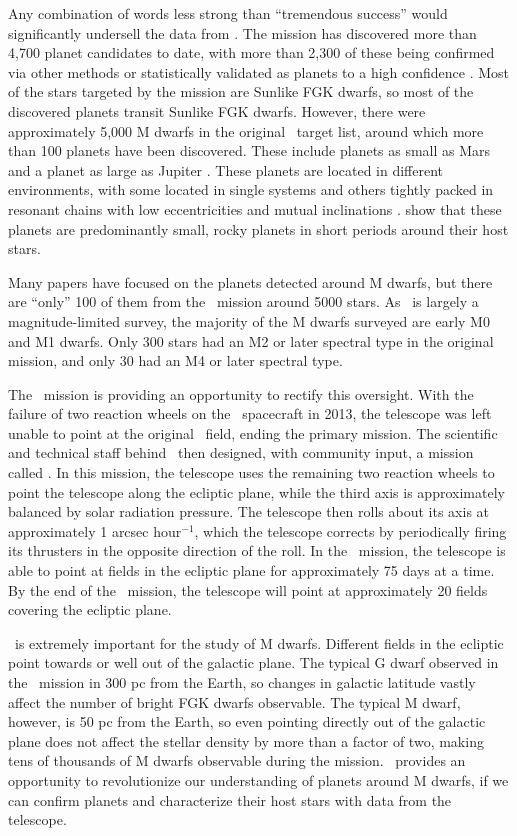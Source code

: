 Any combination of words less strong than ``tremendous success'' would significantly undersell the data from \kep.
The mission has discovered more than 4,700 planet candidates to date, with more than 
2,300 of these being confirmed via other methods or statistically validated as planets
to a high confidence \citep{Batalha13, Burke14, Mullally15, Rowe15, Morton16}.
Most of the stars targeted by the mission are Sunlike FGK dwarfs, so most of the discovered
planets transit Sunlike FGK dwarfs.
However, there were approximately 5,000 M dwarfs in the original \kep\ target list, around
which more than 100 planets have been discovered.
These include planets as small as Mars \citep{KOI961} and a planet as large as Jupiter
\citep{Johnson11c}.
These planets are located in different environments, with some located in single systems
and others tightly packed in resonant chains with low eccentricities and mutual inclinations
\citep{Swift13, Ballard16}.
\citet{Morton14} show that these planets are predominantly small, rocky planets in short
periods around their host stars.

Many papers have focused on the planets detected around M dwarfs, but there are ``only'' 100
of them from the \kep\ mission around 5000 stars. As \kep\ is largely a magnitude-limited
survey, the majority of the M dwarfs surveyed are early M0 and M1 dwarfs. 
Only 300 stars had an M2 or later spectral type in the original mission, and only 30 had
an M4 or later spectral type.

The \KT\ mission is providing an opportunity to rectify this oversight.
With the failure of two reaction wheels on the \kep\ spacecraft in 2013, the telescope
was left unable to point at the original \kep\ field, ending the primary mission.
The scientific and technical staff behind \kep\ then designed, with community input,
a mission called \KT. 
In this mission, the telescope uses the remaining two reaction wheels to point the telescope
along the ecliptic plane, while the third axis is approximately balanced by solar radiation
pressure.
The telescope then rolls about its axis at approximately 1 arcsec hour$^{-1}$, which 
the telescope corrects by periodically firing its thrusters in the opposite direction
of the roll.
In the \KT\ mission, the telescope is able to point at fields in the ecliptic plane for
approximately 75 days at a time.
By the end of the \KT\ mission, the telescope will point at approximately 20 fields
covering the ecliptic plane.

\KT\ is extremely important for the study of M dwarfs.
Different fields in the ecliptic point towards or well out of the galactic plane.
The typical G dwarf observed in the \kep\ mission in 300 pc from the Earth, so changes
in galactic latitude vastly affect the number of bright FGK dwarfs observable.
The typical M dwarf, however, is 50 pc from the Earth, so even pointing directly out of the
galactic plane does not affect the stellar density by more than a factor of two, making 
tens of thousands of M dwarfs observable during the mission. 
\KT\ provides an opportunity to revolutionize our understanding of planets around M dwarfs,
if we can confirm planets and characterize their host stars with data from the telescope.

